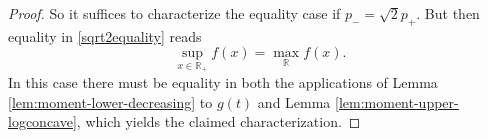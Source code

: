 \documentclass{article}
\theoremstyle{plain}
\theoremstyle{definition}
\newcommand{\1}{\mathbf 1}
\begin{document}
\begin{proof}
So it suffices to characterize the equality case if $p_{-} = \sqrt 2 p_{+}$. But then 
equality in \eqref{sqrt2equality} reads 
$$
\sup_{x\in \mathbb R_+} f(x) = \max_{\mathbb R}f(x).
$$ %
In this case there must be equality in both the applications of Lemma \ref{lem:moment-lower-decreasing} to $g(t)$ and Lemma \ref{lem:moment-upper-logconcave}, which yields the claimed characterization. 
\end{proof}
    
    
    
    
    
    
    
    
    
    
    
    
    
    
    
\end{document}
